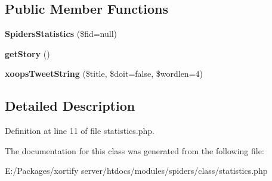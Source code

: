 \subsection*{Public Member Functions}
\begin{DoxyCompactItemize}
\item 
\hypertarget{class_spiders_statistics_a6028006aae77710609f0ca5b5ffbd5a1}{{\bfseries Spiders\-Statistics} (\$fid=null)}\label{class_spiders_statistics_a6028006aae77710609f0ca5b5ffbd5a1}

\item 
\hypertarget{class_spiders_statistics_aecaffaaeb59f5db07c1c9df5d9ddf1dc}{{\bfseries get\-Story} ()}\label{class_spiders_statistics_aecaffaaeb59f5db07c1c9df5d9ddf1dc}

\item 
\hypertarget{class_spiders_statistics_a72291e7960ce877710837e184100e8ba}{{\bfseries xoops\-Tweet\-String} (\$title, \$doit=false, \$wordlen=4)}\label{class_spiders_statistics_a72291e7960ce877710837e184100e8ba}

\end{DoxyCompactItemize}


\subsection{Detailed Description}


Definition at line 11 of file statistics.\-php.



The documentation for this class was generated from the following file\-:\begin{DoxyCompactItemize}
\item 
E\-:/\-Packages/xortify server/htdocs/modules/spiders/class/statistics.\-php\end{DoxyCompactItemize}
